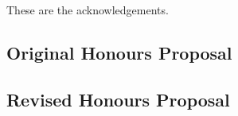 \documentclass{../cshonours}
\title{\thetitle}
\author{\theauthor}
\begin{document}
\newcommand{\mainfile}{} %

\maketitle

\begin{abstract}
This is the abstract.
\end{abstract}

\begin{acknowledgements}
These are the acknowledgements.

\end{acknowledgements}

\tableofcontents
\listoftables
\listoffigures

\begin{refsection}
  
  
  
  
  
  \appendix
  
  \printbibliography
\end{refsection}

\begin{refsection}
  \chapter{Original Honours Proposal}
  
  \printbibliography
\end{refsection}

\begin{refsection}
  \chapter{Revised Honours Proposal}
  
  \printbibliography
\end{refsection}
\end{document}
